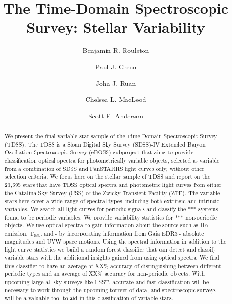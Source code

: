 \documentclass[twocolumn, tighten, astrosymb]{aastex631}
\begin{document}
\title{The Time-Domain Spectroscopic Survey: Stellar Variability}



\author[0000-0002-9453-7735]{Benjamin R. Roulston}
\author[0000-0002-8179-9445]{Paul J. Green}
\author[0000-0001-8665-5523]{John J. Ruan}
\author{Chelsea L. MacLeod}
\author{Scott F. Anderson}


\begin{abstract}
We present the final variable star sample of the Time-Domain Spectroscopic Survey (TDSS). The TDSS is a Sloan Digital Sky Survey (SDSS)-IV Extended Baryon Oscillation Spectroscopic Survey (eBOSS) subproject that aims to provide classification optical spectra for photometrically variable objects, selected as variable from a combination of SDSS and PanSTARRS light curves only, without other selection criteria. We focus here on the stellar sample of TDSS and report on the 23,595 stars that have TDSS optical spectra and photometric light curves from either the Catalina Sky Survey (CSS) or the Zwicky Transient Facility (ZTF).  The variable stars here cover a wide range of spectral types, including both extrinsic and intrinsic variables. We search all light curves for periodic signals and classify the *** systems found to be periodic variables. We provide variability statistics for *** non-periodic objects. We use optical spectra to gain information about the source such as H$\alpha$ emission, T$_{\textrm{Eff.}}$, and - by incorporating information from Gaia EDR3 - absolute magnitudes and UVW space motions. Using the spectral information in addition to the light curve statistics we build a random forest classifier that can detect and classify variable stars with the additional insights gained from using optical spectra. We find this classifier to have an average of XX\% accuracy of distinguishing between different periodic types and an average of XX\% accuracy for non-periodic objects. With upcoming large all-sky surveys like LSST, accurate and fast classification will be necessary to work through the upcoming torrent of data, and spectroscopic surveys will be a valuable tool to aid in this classification of variable stars.
\end{abstract}
\end{document}
